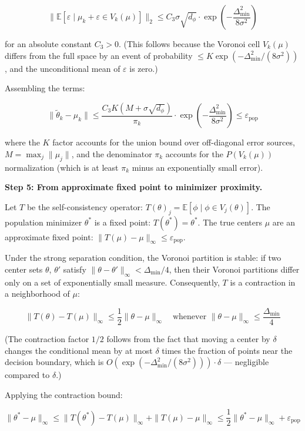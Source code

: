 \documentclass[
  12pt,
]{ctexart}
\begin{document}
\[\|\mathbb{E}[\varepsilon \mid \mu_k + \varepsilon \in V_k(\mu)]\|_2 \leq C_3 \sigma \sqrt{d_\phi} \cdot \exp\left(-\frac{\Delta_{\min}^2}{8\sigma^2}\right)\]

for an absolute constant \(C_3 > 0\). (This follows because the Voronoi
cell \(V_k(\mu)\) differs from the full space by an event of probability
\(\leq K \exp(-\Delta_{\min}^2/(8\sigma^2))\), and the unconditional
mean of \(\varepsilon\) is zero.)

Assembling the terms:

\[\|\tilde{\theta}_k - \mu_k\| \leq \frac{C_3 K (M + \sigma\sqrt{d_\phi})}{\pi_k} \cdot \exp\left(-\frac{\Delta_{\min}^2}{8\sigma^2}\right) \leq \varepsilon_{\text{pop}}\]

where the \(K\) factor accounts for the union bound over off-diagonal
error sources, \(M = \max_j \|\mu_j\|\), and the denominator \(\pi_k\)
accounts for the \(P(V_k(\mu))\) normalization (which is at least
\(\pi_k\) minus an exponentially small error).

\textbf{Step 5: From approximate fixed point to minimizer proximity.}

Let \(T\) be the self-consistency operator:
\(T(\theta)_j = \mathbb{E}[\phi \mid \phi \in V_j(\theta)]\). The
population minimizer \(\theta^*\) is a fixed point:
\(T(\theta^*) = \theta^*\). The true centers \(\mu\) are an approximate
fixed point: \(\|T(\mu) - \mu\|_\infty \leq \varepsilon_{\text{pop}}\).

Under the strong separation condition, the Voronoi partition is stable:
if two center sets \(\theta\), \(\theta'\) satisfy
\(\|\theta - \theta'\|_\infty < \Delta_{\min}/4\), then their Voronoi
partitions differ only on a set of exponentially small measure.
Consequently, \(T\) is a contraction in a neighborhood of \(\mu\):

\[\|T(\theta) - T(\mu)\|_\infty \leq \frac{1}{2} \|\theta - \mu\|_\infty \quad \text{whenever } \|\theta - \mu\|_\infty \leq \frac{\Delta_{\min}}{4}\]

(The contraction factor \(1/2\) follows from the fact that moving a
center by \(\delta\) changes the conditional mean by at most \(\delta\)
times the fraction of points near the decision boundary, which is
\(O(\exp(-\Delta_{\min}^2/(8\sigma^2))) \cdot \delta\) --- negligible
compared to \(\delta\).)

Applying the contraction bound:

\[\|\theta^* - \mu\|_\infty \leq \|T(\theta^*) - T(\mu)\|_\infty + \|T(\mu) - \mu\|_\infty \leq \frac{1}{2} \|\theta^* - \mu\|_\infty + \varepsilon_{\text{pop}}\]
\end{document}
